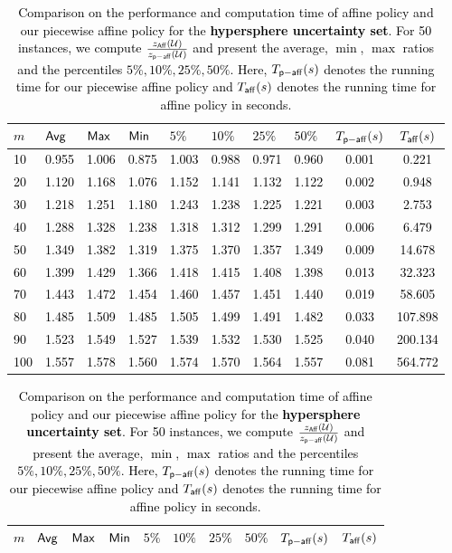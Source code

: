 \documentclass[11pt]{article}
\theoremstyle{plain}
\theoremstyle{definition}
\numberwithin{equation}{section}%
\numberwithin{equation}{section}%
\newcommand*{\red}{\textcolor{black}}
\begin{document}
 \begin{table}[]
 \red{
\centering
\begin{tabular}{|l|l|l|l|l|l|l|l|c|c|}
\hline
$m$ & ${\sf Avg}$ &  ${\sf Max}$& ${\sf Min}$ &   $5\%$ & $10\%$ &  $25\%$  & $50\%$  & $T_{\sf p-aff}(s)$ & $T_{\sf aff}(s)$\\ \hline
10  & 0.955 & 1.006 & 0.875 & 1.003 & 0.988 & 0.971 & 0.960 & 0.001 & 0.221   \\\hline
20  & 1.120 & 1.168 & 1.076 & 1.152 & 1.141 & 1.132 & 1.122 & 0.002 & 0.948   \\\hline
30  & 1.218 & 1.251 & 1.180 & 1.243 & 1.238 & 1.225 & 1.221 & 0.003 & 2.753   \\\hline
40  & 1.288 & 1.328 & 1.238 & 1.318 & 1.312 & 1.299 & 1.291 & 0.006 & 6.479   \\\hline
50  & 1.349 & 1.382 & 1.319 & 1.375 & 1.370 & 1.357 & 1.349 & 0.009 & 14.678  \\\hline
60  & 1.399 & 1.429 & 1.366 & 1.418 & 1.415 & 1.408 & 1.398 & 0.013 & 32.323  \\\hline
70  & 1.443 & 1.472 & 1.454 & 1.460 & 1.457 & 1.451 & 1.440 & 0.019 & 58.605  \\\hline
80  & 1.485 & 1.509 & 1.485 & 1.505 & 1.499 & 1.491 & 1.482 & 0.033 & 107.898 \\\hline
90  & 1.523 & 1.549 & 1.527 & 1.539 & 1.532 & 1.530 & 1.525 & 0.040 & 200.134 \\\hline
100 & 1.557 & 1.578 & 1.560 & 1.574 & 1.570 & 1.564 & 1.557 & 0.081 & 564.772\\\hline
\end{tabular}%
\caption{Comparison on the performance and computation time of affine policy and our piecewise affine policy for the {\bf hypersphere uncertainty set}. For 50 instances, we compute $ \frac{z_{\sf{Aff}} ({\cal U})    }{z_{\sf{p-aff}}  ({\cal U})         }$ and present the average, $\min$, $\max$ ratios and the percentiles $5\%, 10\%, 25\%, 50\%$. Here, $T_{\sf p-aff}(s)$ denotes the running time for our piecewise affine policy and $T_{\sf aff}(s)$ denotes the running time for affine policy in seconds.
}
\label{tab:simu:sphere}
\bigskip
\begin{tabular}{|l|l|l|l|l|l|l|l|c|c|}
\hline
$m$ & ${\sf Avg}$ &  ${\sf Max}$& ${\sf Min}$ &   $5\%$ & $10\%$ &  $25\%$  & $50\%$  & $T_{\sf p-aff}(s)$ & $T_{\sf aff}(s)$\\ \hline

\end{tabular}}
\end{table}
\end{document}
